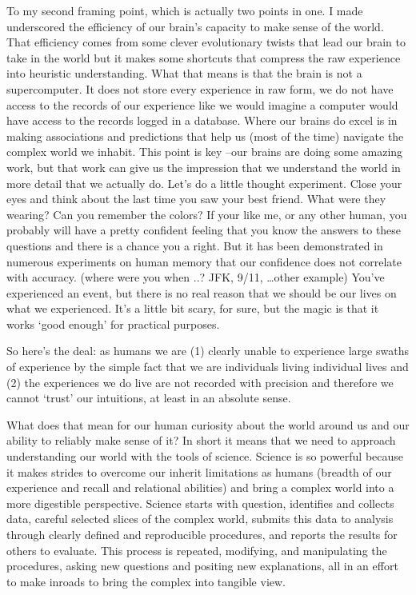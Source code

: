 \documentclass[
]{article}
\begin{document}
To my second framing point, which is actually two points in one. I made underscored the efficiency of our brain's capacity to make sense of the world. That efficiency comes from some clever evolutionary twists that lead our brain to take in the world but it makes some shortcuts that compress the raw experience into heuristic understanding. What that means is that the brain is not a supercomputer. It does not store every experience in raw form, we do not have access to the records of our experience like we would imagine a computer would have access to the records logged in a database. Where our brains do excel is in making associations and predictions that help us (most of the time) navigate the complex world we inhabit. This point is key --our brains are doing some amazing work, but that work can give us the impression that we understand the world in more detail that we actually do. Let's do a little thought experiment. Close your eyes and think about the last time you saw your best friend. What were they wearing? Can you remember the colors? If your like me, or any other human, you probably will have a pretty confident feeling that you know the answers to these questions and there is a chance you a right. But it has been demonstrated in numerous experiments on human memory that our confidence does not correlate with accuracy. (where were you when ..? JFK, 9/11, \ldots other example) You've experienced an event, but there is no real reason that we should be our lives on what we experienced. It's a little bit scary, for sure, but the magic is that it works `good enough' for practical purposes.

So here's the deal: as humans we are (1) clearly unable to experience large swaths of experience by the simple fact that we are individuals living individual lives and (2) the experiences we do live are not recorded with precision and therefore we cannot `trust' our intuitions, at least in an absolute sense.

What does that mean for our human curiosity about the world around us and our ability to reliably make sense of it? In short it means that we need to approach understanding our world with the tools of science. Science is so powerful because it makes strides to overcome our inherit limitations as humans (breadth of our experience and recall and relational abilities) and bring a complex world into a more digestible perspective. Science starts with question, identifies and collects data, careful selected slices of the complex world, submits this data to analysis through clearly defined and reproducible procedures, and reports the results for others to evaluate. This process is repeated, modifying, and manipulating the procedures, asking new questions and positing new explanations, all in an effort to make inroads to bring the complex into tangible view.
\end{document}
